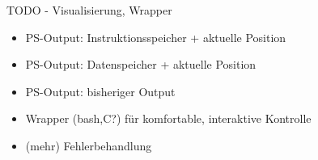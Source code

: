 \documentclass{beamer}
\begin{document}
\begin{frame}{TODO - Visualisierung, Wrapper}

    \begin{itemize}
        \item PS-Output: Instruktionsspeicher + aktuelle Position
        \item PS-Output: Datenspeicher + aktuelle Position
        \item PS-Output: bisheriger Output
        \item Wrapper (bash,C?) für komfortable, interaktive Kontrolle
        \item (mehr) Fehlerbehandlung
    \end{itemize}

\end{frame}
\end{document}
